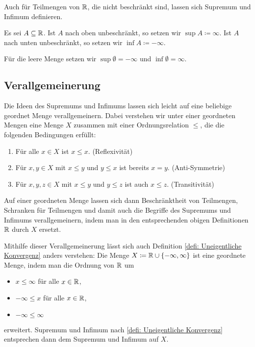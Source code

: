 \documentclass[a4paper,10pt]{article}
\begin{document}
Auch für Teilmengen von $\mathbb{R}$, die nicht beschränkt sind, lassen sich Supremum und Infimum definieren.


\begin{defi}\label{defi: Uneigentliche Konvergenz}
 Es sei $A \subseteq \mathbb{R}$. Ist $A$ nach oben unbeschränkt, so setzen wir $\sup A \coloneqq \infty$. Ist $A$ nach unten unbeschränkt, so setzen wir $\inf A \coloneqq -\infty$.
 
 Für die leere Menge setzen wir $\sup \emptyset = -\infty$ und $\inf \emptyset = \infty$.
\end{defi}



\subsection{Verallgemeinerung}
Die Ideen des Supremums und Infimums lassen sich leicht auf eine beliebige geordnet Menge verallgemeinern. Dabei verstehen wir unter einer geordneten Mengen eine Menge $X$ zusammen mit einer Ordnungsrelation $\leq$, die die folgenden Bedingungen erfüllt:
\begin{enumerate}
 \item
  Für alle $x \in X$ ist $x \leq x$. (Reflexivität)
 \item
  Für $x,y \in X$ mit $x \leq y$ und $y \leq x$ ist bereits $x = y$. (Anti-Symmetrie)
 \item
  Für $x,y,z \in X$ mit $x \leq y$ und $y \leq z$ ist auch $x \leq z$. (Transitivität)
\end{enumerate}

Auf einer geordneten Menge lassen sich dann Beschränktheit von Teilmengen, Schranken für Teilmengen und damit auch die Begriffe des Supremums und Infimums verallgemeinern, indem man in den entsprechenden obigen Definitionen $\mathbb{R}$ durch $X$ ersetzt.

Mithilfe dieser Verallgemeinerung lässt sich auch Definition \ref{defi: Uneigentliche Konvergenz} anders verstehen: Die Menge $X \coloneqq \mathbb{R} \cup \{-\infty, \infty\}$ ist eine geordnete Menge, indem man die Ordnung von $\mathbb{R}$ um
\begin{itemize}
 \item
  $x \leq \infty$ für alle $x \in \mathbb{R}$,
 \item
  $-\infty \leq x$ für alle $x \in \mathbb{R}$,
 \item
  $-\infty \leq \infty$
\end{itemize}
erweitert. Supremum und Infimum nach \ref{defi: Uneigentliche Konvergenz} entsprechen dann dem Supremum und Infimum auf $X$.
\end{document}
